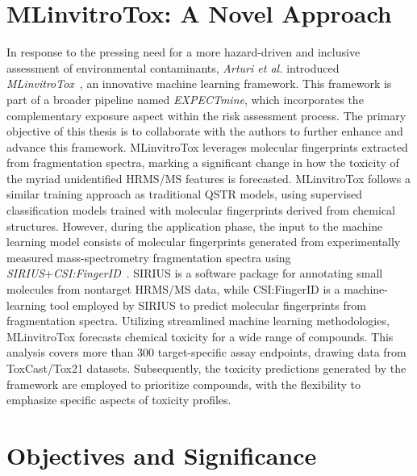 \section{MLinvitroTox: A Novel Approach}

In response to the pressing need for a more hazard-driven and inclusive assessment of environmental contaminants, \emph{Arturi et al.} introduced \emph{MLinvitroTox}~\cite{arturi}, an innovative machine learning framework. This framework is part of a broader pipeline named \emph{EXPECTmine}, which incorporates the complementary exposure aspect within the risk assessment process. The primary objective of this thesis is to collaborate with the authors to further enhance and advance this framework. MLinvitroTox leverages molecular fingerprints extracted from fragmentation spectra, marking a significant change in how the toxicity of the myriad unidentified HRMS/MS features is forecasted. MLinvitroTox follows a similar training approach as traditional QSTR models, using supervised classification models trained with molecular fingerprints derived from chemical structures. However, during the application phase, the input to the machine learning model consists of molecular fingerprints generated from experimentally measured mass-spectrometry fragmentation spectra using \emph{SIRIUS}+\emph{CSI:FingerID}~\cite{sirius2019}. SIRIUS is a software package for annotating small molecules from nontarget HRMS/MS data, while CSI:FingerID is a machine-learning tool employed by SIRIUS to predict molecular fingerprints from fragmentation spectra. Utilizing streamlined machine learning methodologies, MLinvitroTox forecasts chemical toxicity for a wide range of compounds. This analysis covers more than 300 target-specific assay endpoints, drawing data from ToxCast/Tox21 datasets. Subsequently, the toxicity predictions generated by the framework are employed to prioritize compounds, with the flexibility to emphasize specific aspects of toxicity profiles.

\section{Objectives and Significance}

